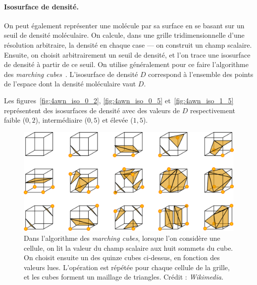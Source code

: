 	\paragraph{Isosurface de densité.} On peut également représenter une molécule par sa surface en se basant sur un seuil de densité moléculaire. On calcule, dans une grille tridimensionnelle d'une résolution arbitraire, la densité en chaque case --- on construit un champ scalaire. Ensuite, on choisit arbitrairement un seuil de densité, et l'on trace une isosurface de densité à partir de ce seuil. On utilise généralement pour ce faire l'algorithme des \emph{marching cubes}~\cite{lorensen1987marching}. L'isosurface de densité $D$ correspond à l'ensemble des points de l'espace dont la densité moléculaire vaut $D$.
		
	Les figures~\ref{fig:4awn_iso_0_2}, \ref{fig:4awn_iso_0_5} et~\ref{fig:4awn_iso_1_5} représentent des isosurfaces de densité avec des valeurs de $D$ respectivement faible ($0,2$), intermédiaire ($0,5$) et élevée ($1,5$).
		
	\begin{figure}[H]
	    \centering
	    \includegraphics[width=\textwidth]{figures/ch1/marchingCubes}
		\caption{Dans l'algorithme des \emph{marching cubes}, lorsque l'on considère une cellule, on lit la valeur du champ scalaire aux huit sommets du cube. On choisit ensuite un des quinze cubes ci-dessus, en fonction des valeurs lues. L'opération est répétée pour chaque cellule de la grille, et les cubes forment un maillage de triangles. Crédit : \emph{Wikimedia}.}
        \label{fig:marchingCubes}
	\end{figure}
		
